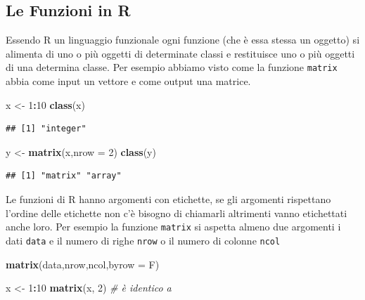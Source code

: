 \documentclass[
  11pt,
]{book}
\newenvironment{Shaded}{\begin{snugshade}}{\end{snugshade}}
\newcommand{\AttributeTok}[1]{\textcolor[rgb]{0.13,0.29,0.53}{#1}}
\newcommand{\CommentTok}[1]{\textcolor[rgb]{0.56,0.35,0.01}{\textit{#1}}}
\newcommand{\DecValTok}[1]{\textcolor[rgb]{0.00,0.00,0.81}{#1}}
\newcommand{\FunctionTok}[1]{\textcolor[rgb]{0.13,0.29,0.53}{\textbf{#1}}}
\newcommand{\NormalTok}[1]{#1}
\newcommand{\OtherTok}[1]{\textcolor[rgb]{0.56,0.35,0.01}{#1}}
\newcommand{\SpecialCharTok}[1]{\textcolor[rgb]{0.81,0.36,0.00}{\textbf{#1}}}
\theoremstyle{mytheoremstyle}
\theoremstyle{mydefstyle}
\begin{document}
\subsection{Le Funzioni in R}\label{le-funzioni-in-r}

Essendo R un linguaggio funzionale ogni funzione (che è essa stessa un oggetto)
si alimenta di uno o più oggetti di determinate classi e restituisce uno o
più oggetti di una determina classe. Per esempio abbiamo visto come la funzione
\texttt{matrix} abbia come input un vettore e come output una matrice.

\begin{Shaded}
\begin{Highlighting}[]
\NormalTok{x }\OtherTok{\textless{}{-}} \DecValTok{1}\SpecialCharTok{:}\DecValTok{10}
\FunctionTok{class}\NormalTok{(x)}
\end{Highlighting}
\end{Shaded}

\begin{verbatim}
## [1] "integer"
\end{verbatim}

\begin{Shaded}
\begin{Highlighting}[]
\NormalTok{y }\OtherTok{\textless{}{-}} \FunctionTok{matrix}\NormalTok{(x,}\AttributeTok{nrow =} \DecValTok{2}\NormalTok{)}
\FunctionTok{class}\NormalTok{(y)}
\end{Highlighting}
\end{Shaded}

\begin{verbatim}
## [1] "matrix" "array"
\end{verbatim}

Le funzioni di R hanno argomenti con etichette, se gli argomenti rispettano l'ordine
delle etichette non c'è bisogno di chiamarli altrimenti vanno etichettati anche loro.
Per esempio la funzione \texttt{matrix} si aspetta almeno due argomenti i dati \texttt{data}
e il numero di righe \texttt{nrow} o il numero di colonne \texttt{ncol}

\begin{Shaded}
\begin{Highlighting}[]
\FunctionTok{matrix}\NormalTok{(data,nrow,ncol,}\AttributeTok{byrow =}\NormalTok{ F)}
\end{Highlighting}
\end{Shaded}

\begin{Shaded}
\begin{Highlighting}[]
\NormalTok{x }\OtherTok{\textless{}{-}} \DecValTok{1}\SpecialCharTok{:}\DecValTok{10}
\FunctionTok{matrix}\NormalTok{(x, }\DecValTok{2}\NormalTok{)                }\CommentTok{\# è identico a}
\end{Highlighting}
\end{Shaded}
\end{document}
